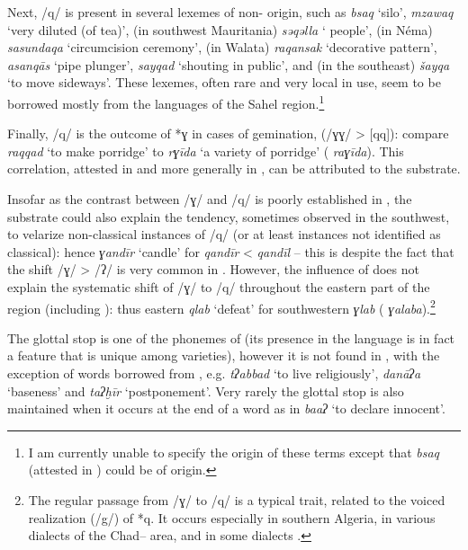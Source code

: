 \documentclass[output=paper]{langsci/langscibook}
\begin{document}
Next, /q/ is present in several lexemes of non- origin, such as \textit{bsaq} ‘silo’, \textit{mzaw{\R}aq} ‘very diluted (of tea)’, (in southwest Mauritania) \textit{sə{\R}qəlla} ‘ people’, (in Néma) \textit{sasundaqa} ‘circumcision ceremony’, (in Walata) \textit{raqansak} ‘decorative pattern’, \textit{asanqās} ‘pipe plunger’, \textit{sayqad} ‘shouting in public’, and (in the southeast) \textit{šayqa} ‘to move sideways’. These lexemes, often rare and very local in use, seem to be borrowed mostly from the languages of the Sahel region.\footnote{I am currently unable to specify the origin of these terms except that \textit{bsaq} (attested in ) could be of  origin.}

Finally, /q/ is the outcome of *ɣ in cases of gemination, (/ɣɣ/ > [qq]): compare \textit{raqqad} ‘to make porridge’ to \textit{rɣīda} ‘a variety of porridge’ ( \textit{raɣīda}). This correlation, attested in  and more generally in , can be attributed to the {substrate}.

Insofar as the contrast between /ɣ/ and /q/ is poorly established in , the {substrate} could also explain the tendency, sometimes observed in the southwest, to velarize non-classical instances of /q/ (or at least instances not identified as classical): hence \textit{ɣandīr} ‘candle’ for \textit{qandīr} <  \textit{qandīl} – this is despite the fact that the shift /ɣ/ > /ʔ/ is very common in . However, the influence of  does not explain the systematic shift of /ɣ/ to /q/ throughout the eastern part of the  region (including ): thus eastern \textit{qlab} ‘defeat’ for southwestern \textit{ɣlab} ( \textit{ɣalaba}).\footnote{The regular passage from /ɣ/ to /q/ is a typical  trait, related to the voiced realization (/g/) of *q. It occurs especially in southern Algeria, in various dialects of the Chad– area, and in some  dialects \citep[72]{Cantineau1960book}.}

The glottal stop is one of the phonemes of  (its presence in the language is in fact a feature that is unique among  varieties), however it is not found in , with the exception of words borrowed from  , e.g. \textit{tʔabbad} ‘to live religiously’, \textit{danāʔa} ‘baseness’ and \textit{taʔḫīr} ‘postponement’. Very rarely the glottal stop is also maintained when it occurs at the end of a word as in \textit{ba{\R}{\R}aʔ} ‘to declare innocent’.
\end{document}
